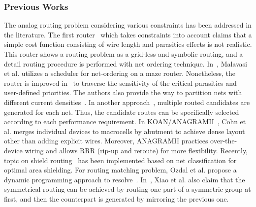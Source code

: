       \subsubsection{Previous Works}
        The analog routing problem considering various constraints has been addressed in the literature. The first router~\cite{anrmfca-CICC1990} which takes constraints into account claims that a simple cost function consisting of wire length and parasitics effects is not realistic. This router shows a routing problem as a grid-less and symbolic routing, and a detail routing procedure is performed with net ordering technique. In~\cite{GeneralRouter-CompEuro89}, Malavasi et al. utilizes a scheduler for net-ordering on a maze router. Nonetheless, the router is improved in~\cite{sensitAR-iccad90} to traverse the sensitivity of the critical parasitics and user-defined priorities. The authors also provide the way to partition nets with different current densities~\cite{arearouting-tcad1993}. In another approach~\cite{GRforAMS-SOCC2001}, multiple routed candidates are generated for each net. Thus, the candidate routes can be specifically selected according to each performance requirement. In KOAN/ANAGRAMII~\cite{KOAN_ANAGRAMII-JSSC1991}, Cohn et al. merges individual devices to macrocells by abutment to achieve dense layout other than adding explicit wires. Moreover, ANAGRAMII practices over-the-device wiring and allows RRR (rip-up and reroute) for more flexibility. Recently, topic on shield routing~\cite{shieldRouting-islped2010} has been implemented based on net classification for optimal area shielding. For routing matching problem, Ozdal et al. propose a dynamic programming approach to resolve~\cite{AnalogRouteMatching-iccad2009}. In~\cite{ppraic_Linfu_iccad2010}, Xiao et al. also claim that the symmetrical routing can be achieved by routing one part of a symmetric group at first, and then the counterpart is generated by mirroring the previous one.
        
